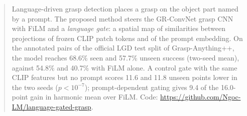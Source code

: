 \begin{strip}
\centering
\vspace{-3.0em}
\resizebox{\textwidth}{!}{}
\captionsetup{hypcap=false}
\label{fig:arch}
\vspace{-1.6em}
\end{strip}

\begin{abstract}
Language-driven grasp detection places a grasp on the object part named by a prompt. The proposed method steers the GR-ConvNet grasp CNN with FiLM and a \emph{language gate}: a spatial map of similarities between projections of frozen CLIP patch tokens and of the prompt embedding. On the annotated pairs of the official LGD test split of Grasp-Anything++, the model reaches 68.6\% seen and 57.7\% unseen success (two-seed mean), against 54.8\% and 40.7\% with FiLM alone. A control gate with the same CLIP features but no prompt scores 11.6 and 11.8 unseen points lower in the two seeds ($p<10^{-7}$); prompt-dependent gating gives 9.4 of the 16.0-point gain in harmonic mean over FiLM. Code: \url{https://github.com/Ngoc-LM/language-gated-grasp}.
\end{abstract}
